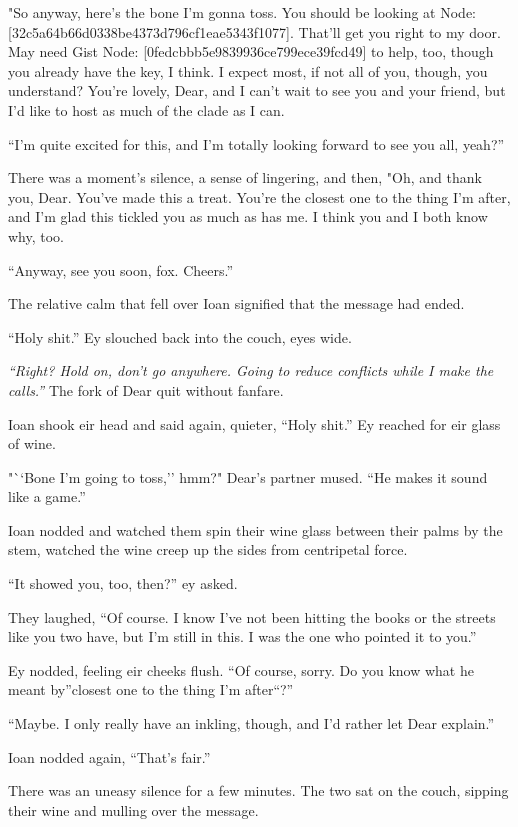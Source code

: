 "So anyway, here's the bone I'm gonna toss. You should be looking at Node: {[}32c5a64b66d0338be4373d796cf1eae5343f1077{]}. That'll get you right to my door. May need Gist Node: {[}0fedcbbb5e9839936ce799ece39fcd49{]} to help, too, though you already have the key, I think. I expect most, if not all of you, though, you understand? You're lovely, Dear, and I can't wait to see you and your friend, but I'd like to host as much of the clade as I can.

``I'm quite excited for this, and I'm totally looking forward to see you all, yeah?''

There was a moment's silence, a sense of lingering, and then, "Oh, and thank you, Dear. You've made this a treat. You're the closest one to the thing I'm after, and I'm glad this tickled you as much as has me. I think you and I both know why, too.

``Anyway, see you soon, fox. Cheers.''

The relative calm that fell over Ioan signified that the message had ended.

``Holy shit.'' Ey slouched back into the couch, eyes wide.

\emph{``Right? Hold on, don't go anywhere. Going to reduce conflicts while I make the calls.''} The fork of Dear quit without fanfare.

Ioan shook eir head and said again, quieter, ``Holy shit.'' Ey reached for eir glass of wine.

"``Bone I'm going to toss,'' hmm?" Dear's partner mused. ``He makes it sound like a game.''

Ioan nodded and watched them spin their wine glass between their palms by the stem, watched the wine creep up the sides from centripetal force.

``It showed you, too, then?'' ey asked.

They laughed, ``Of course. I know I've not been hitting the books or the streets like you two have, but I'm still in this. I was the one who pointed it to you.''

Ey nodded, feeling eir cheeks flush. ``Of course, sorry. Do you know what he meant by''closest one to the thing I'm after``?''

``Maybe. I only really have an inkling, though, and I'd rather let Dear explain.''

Ioan nodded again, ``That's fair.''

There was an uneasy silence for a few minutes. The two sat on the couch, sipping their wine and mulling over the message.

